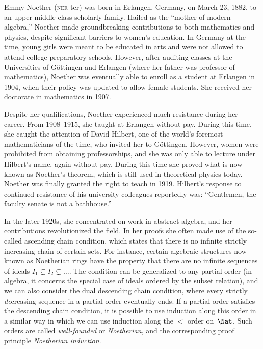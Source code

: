 \documentclass[../../../include/open-logic-section]{subfiles}
\begin{document}



Emmy Noether (\textsc{ner}-ter) was born in Erlangen, Germany, on
March 23, 1882, to an upper-middle class scholarly family. Hailed as
the ``mother of modern algebra,'' Noether made groundbreaking
contributions to both mathematics and physics, despite significant
barriers to women's education. In Germany at the time, young girls
were meant to be educated in arts and were not allowed to attend
college preparatory schools.  However, after auditing classes at the
Universities of G\"{o}ttingen and Erlangen (where her father was
professor of mathematics), Noether was eventually able to enroll as a
student at Erlangen in 1904, when their policy was updated to allow
female students. She received her doctorate in mathematics in 1907.

Despite her qualifications, Noether experienced much resistance during
her career. From 1908--1915, she taught at Erlangen without
pay. During this time, she caught the attention of David Hilbert, one
of the world's foremost mathematicians of the time, who invited her to
G\"{o}ttingen. However, women were prohibited from obtaining
professorships, and she was only able to lecture under Hilbert's name,
again without pay. During this time she proved what is now known as
Noether's theorem, which is still used in theoretical physics
today. Noether was finally granted the right to teach in 1919.
Hilbert's response to continued resistance of his university
colleagues reportedly was: ``Gentlemen, the faculty senate is not a
bathhouse.''

In the later 1920s, she concentrated on work in abstract algebra, and
her contributions revolutionized the field.  In her proofs she often
made use of the so-called ascending chain condition, which states that
there is no infinite strictly increasing chain of certain sets. For
instance, certain algebraic structures now known as Noetherian rings
have the property that there are no infinite sequences of ideals $I_1
\subsetneq I_2 \subsetneq \dots$.  The condition can be generalized to
any partial order (in algebra, it concerns the special case of ideals
ordered by the subset relation), and we can also consider the dual
descending chain condition, where every strictly \emph{de}creasing
sequence in a partial order eventually ends.  If a partial order
satisfies the descending chain condition, it is possible to use
induction along this order in a similar way in which we can use
induction along the $<$ order on~$\Nat$.  Such orders are called
\emph{well-founded} or \emph{Noetherian}, and the corresponding proof
principle \emph{Noetherian induction}.
\end{document}
